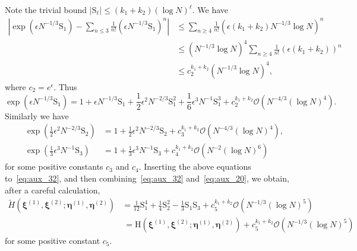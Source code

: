 \documentclass{article}
\numberwithin{equation}{section}
\newcommand{\bigO}{\mathcal{O}}
\begin{document}
Note the trivial bound  $|\mathrm{S}_\ell| \le  (k_1+k_2)(\log N)^\ell$. We have
\begin{equation*}
	\begin{split}
	\left|\exp\left(\epsilon N^{-1/3}\mathrm{S}_1\right)-\sum_{n\le 3}\frac{1}{n!}(\epsilon N^{-1/3}\mathrm{S}_1)^n\right|
	&\le \sum_{n\ge 4}\frac{1}{n!}(\epsilon(k_1+k_2) N^{-1/3}\log N)^n\\
	&\le (N^{-1/3}\log N)^4\sum_{n\ge 4}\frac{1}{n!}(\epsilon(k_1+k_2))^n\\
	&\le c_2^{k_1+k_2}(N^{-1/3}\log N)^4,
	\end{split}
\end{equation*}
where $c_2=e^\epsilon$. Thus
\begin{equation*}
	\exp\left(\epsilon N^{-1/3}\mathrm{S}_1\right)=1+\epsilon N^{-1/3}\mathrm{S}_1 +\frac{1}{2} \epsilon^2 N^{-2/3} \mathrm{S}_1^2 +\frac16 \epsilon^3 N^{-1}\mathrm{S}_1^3 +c_2^{k_1+k_2}\bigO(N^{-4/3}(\log N)^4).
\end{equation*}
Similarly we have
\begin{equation*}
	\begin{split}
		\exp\left(\frac12\epsilon^2 N^{-2/3} \mathrm{S}_2 \right)&=1+\frac12\epsilon^2 N^{-2/3}\mathrm{S}_2 +c_3^{k_1+k_2}\bigO(N^{-4/3}(\log N)^4),\\
		\exp\left(\frac{1}{3}\epsilon^3N^{-1}\mathrm{S}_3\right)&=1+\frac13\epsilon^3 N^{-1}\mathrm{S}_3+c_4^{k_1+k_2}\bigO\left(N^{-2}(\log N)^6\right)
	\end{split}
\end{equation*}
for some positive constants $c_3$ and $c_4$. 
Inserting the above equations to~\eqref{eq:aux_32}, and then combining~\eqref{eq:aux_32} and~\eqref{eq:aux_20}, we obtain, after a careful calculation,
\begin{equation}
	\label{eq:aux_21}
	\begin{split}
	\tilde {H}(\boldsymbol{\xi}^{(1)},\boldsymbol{\xi}^{(2)};
	\boldsymbol{\eta}^{(1)},\boldsymbol{\eta}^{(2)})&= \frac{1}{12}\mathrm{S}_1^4 +\frac{1}{4}\mathrm{S}_2^2-\frac{1}{3}\mathrm{S}_1\mathrm{S}_3 +c_5^{k_1+k_2}\bigO(N^{-1/3}(\log N)^5)\\
	&\  =\mathrm{H}(\boldsymbol{\xi}^{(1)},\boldsymbol{\xi}^{(2)};
	\boldsymbol{\eta}^{(1)},\boldsymbol{\eta}^{(2)})  +c_5^{k_1+k_2}\bigO(N^{-1/3}(\log N)^5)
	\end{split}
\end{equation}
for some positive constant $c_5$.
\end{document}
